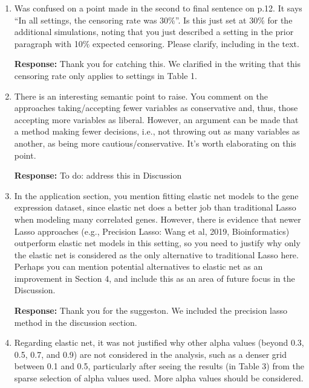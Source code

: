 \documentclass[12]{article}
\newcommand{\re}{\textbf{Response: }}
\newcommand\bd[1]{{\color{blue}#1}}
\begin{document}
\begin{enumerate}[align = left]
\re Thank you for this comment. We provided additional simulation results in the supplement with more choices of $t_0$ with Exponential, Weibull and Gompertz distributions. The overall conclusions do not change with various $t_0$.

\item Was confused on a point made in the second to final sentence on p.12. It says “In all settings, the censoring rate was 30$\%$”. Is this just set at 30$\%$ for the additional simulations, noting that you just described a setting in the prior paragraph with 10$\%$ expected censoring. Please clarify, including in the text. 

\re Thank you for catching this. We clarified in the writing that this censoring rate only applies to settings in Table 1.

\item There is an interesting semantic point to raise. You comment on the approaches taking/accepting fewer variables as conservative and, thus, those accepting more variables as liberal. However, an argument can be made that a method making fewer decisions, i.e., not throwing out as many variables as another, as being more cautious/conservative. It’s worth elaborating on this point.

\re \bd{To do: address this in Discussion}

\item In the application section, you mention fitting elastic net models to the gene expression dataset, since elastic net does a better job than traditional Lasso when modeling many correlated genes. However, there is evidence that newer Lasso approaches (e.g., Precision Lasso: Wang et al, 2019, Bioinformatics) outperform elastic net models in this setting, so you need to justify why only the elastic net is considered as the only alternative to traditional Lasso here. Perhaps you can mention potential alternatives to elastic net as an improvement in Section 4, and include this as an area of future focus in the Discussion.

\re Thank you for the suggeston. We included the precision lasso method in the discussion section.

\item Regarding elastic net, it was not justified why other alpha values (beyond 0.3, 0.5, 0.7, and 0.9) are not considered in the analysis, such as a denser grid between 0.1 and 0.5, particularly after seeing the results (in Table 3) from the sparse selection of alpha values used. More alpha values should be considered.


\end{enumerate}
\end{document}
